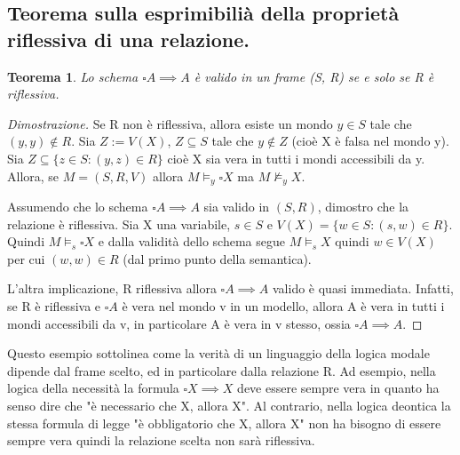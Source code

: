\documentclass{article}
\theoremstyle{definition}
\theoremstyle{plain}
\theoremstyle{plain}
\theoremstyle{plain}
\newtheorem{teorema}{Teorema}
\theoremstyle{plain}
\begin{document}
\subsection{Teorema sulla esprimibilià della proprietà riflessiva di una relazione.}
\begin{teorema}
    Lo schema $\square A \implies A$ è valido in un frame (S, R) se e solo se R è riflessiva.
\end{teorema}
\begin{proof}[Dimostrazione]
    Se R non è riflessiva, allora esiste un mondo $y \in S$ tale che $(y, y) \notin R$. \newline
    Sia $Z:= V(X)$, $Z \subseteq S$ tale che $y \notin Z$ (cioè X è falsa nel mondo y). \newline
    Sia $Z \subseteq \{z \in S : (y, z) \in R\}$ cioè X sia vera in tutti i mondi accessibili da y. Allora, se $M = (S, R, V)$ allora $M \models_y \square X$ ma $M \not\models_y X$. \newline

    Assumendo che lo schema $\square A \implies A$ sia valido in $(S, R)$, dimostro che la relazione è riflessiva. \newline
    Sia X una variabile, $s \in S$ e $V(X) = \{w \in S : (s, w) \in R\}$. Quindi $M \models_s \square X$ e dalla validità dello schema segue $M \models_s X$  quindi $w \in V(X)$ per cui $(w, w) \in R$ (dal primo punto della semantica). \newline
    
    L'altra implicazione, R riflessiva allora $\square A \implies A$ valido è quasi immediata. Infatti, se R è riflessiva e $\square A$ è vera nel mondo v in un modello, allora A è vera in tutti i mondi accessibili da v, in particolare A è vera in v stesso, ossia $\square A \implies A$.  
\end{proof}
Questo esempio sottolinea come la verità di un linguaggio della logica modale dipende dal frame scelto, ed in particolare dalla relazione R.\newline
Ad esempio, nella logica della necessità la formula $\square X \implies X$ deve essere sempre vera in quanto ha senso dire che "è necessario che X, allora X".\newline
Al contrario, nella logica deontica la stessa formula di legge "è obbligatorio che X, allora X" non ha bisogno di essere sempre vera quindi la relazione scelta non sarà riflessiva.
\end{document}
